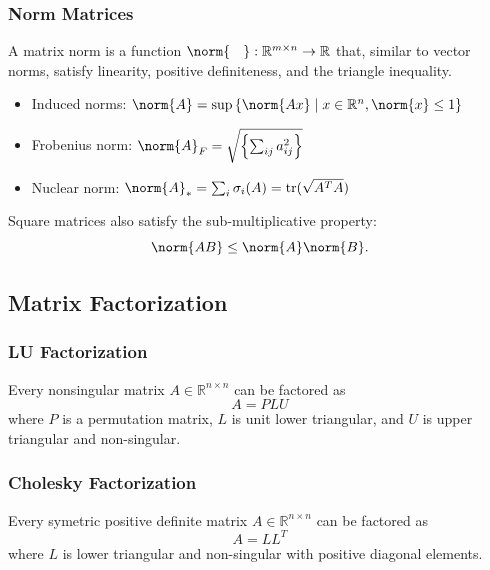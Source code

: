 \documentclass[11pt]{article}
\begin{document}
\subsubsection*{Norm Matrices}
A matrix norm is a function $\norm{\phantom{~.~}}: \mathbb{R}^{m\times n} \rightarrow \mathbb{R}$ that, similar to vector norms, satisfy linearity, positive definiteness, and the triangle inequality. \par
\begin{itemize}
    \item Induced norms: $\norm{A} = \sup \left\{ \norm{Ax} \mid x \in \mathbb{R}^n, \norm{x} \leq 1 \right\}$
    \item Frobenius norm: $\norm{A}_F = \sqrt{\left\{ \sum_{ij} a_{ij}^2 \right\}}$
    \item Nuclear norm: $\norm{A}_* = \sum_i \sigma_i(A) = \mathrm{tr}(\sqrt{A^TA})$  
\end{itemize} 
Square matrices also satisfy the sub-multiplicative property: 
\[ \norm{AB} \leq \norm{A}\norm{B}. \] 

\subsection{Matrix Factorization} 
\subsubsection*{LU Factorization} 
Every nonsingular matrix $A \in \mathbb{R}^{n\times n}$ can be factored as 
\[ A = PLU \] 
where $P$ is a permutation matrix, $L$ is unit lower triangular, and $U$ is upper triangular and non-singular. 
\subsubsection*{Cholesky Factorization} 
Every symetric positive definite matrix $A \in \mathbb{R}^{n\times n}$ can be factored as 
\[ A = LL^T \] 
where $L$ is lower triangular and non-singular with positive diagonal elements. 
\end{document}

